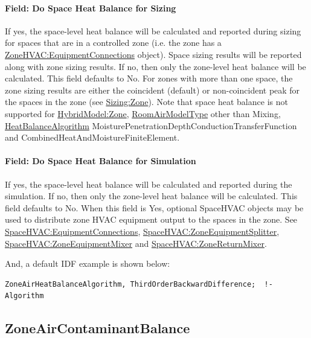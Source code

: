 \paragraph{Field: Do Space Heat Balance for Sizing}\label{field-do-space-heat-balance-sizing}
If yes, the space-level heat balance will be calculated and reported during sizing for spaces that are in a controlled zone (i.e. the zone has a \hyperref[zonehvacequipmentconnections]{ZoneHVAC:EquipmentConnections} object). Space sizing results will be reported along with zone sizing results. If no, then only the zone-level heat balance will be calculated. This field defaults to No. For zones with more than one space, the zone sizing results are either the coincident (default) or non-coincident peak for the spaces in the zone (see \hyperref[field-type-of-space-sum-to-use]{Sizing:Zone}). Note that space heat balance is not supported for \hyperref[inputs-hm]{HybridModel:Zone}, \hyperref[roomairmodeltype]{RoomAirModelType} other than Mixing, \hyperref[heatbalancealgorithm]{HeatBalanceAlgorithm} MoisturePenetrationDepthConductionTransferFunction and CombinedHeatAndMoistureFiniteElement.

\paragraph{Field: Do Space Heat Balance for Simulation}\label{field-do-space-heat-balance-simulation}
If yes, the space-level heat balance will be calculated and reported during the simulation. If no, then only the zone-level heat balance will be calculated. This field defaults to No. When this field is Yes, optional SpaceHVAC objects may be used to distribute zone HVAC equipment output to the spaces in the zone. See \hyperref[spacehvacequipmentconnections]{SpaceHVAC:EquipmentConnections}, \hyperref[spacehvaczoneequipmentsplitter]{SpaceHVAC:ZoneEquipmentSplitter}, \hyperref[spacehvaczoneequipmentmixer]{SpaceHVAC:ZoneEquipmentMixer} and \hyperref[spacehvaczonereturnmixer]{SpaceHVAC:ZoneReturnMixer}.

And, a default IDF example is shown below:

\begin{lstlisting}
ZoneAirHeatBalanceAlgorithm, ThirdOrderBackwardDifference;  !- Algorithm
\end{lstlisting}

\subsection{ZoneAirContaminantBalance}\label{zoneaircontaminantbalance}

